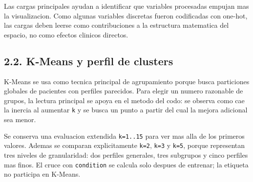 \documentclass[11pt]{article}
\begin{document}
Las cargas principales ayudan a identificar que variables procesadas
empujan mas la visualizacion. Como algunas variables discretas fueron
codificadas con one-hot, las cargas deben leerse como contribuciones a
la estructura matematica del espacio, no como efectos clinicos directos.

    \subsection{2.2. K-Means y perfil de
clusters}\label{k-means-y-perfil-de-clusters}

K-Means se usa como tecnica principal de agrupamiento porque busca
particiones globales de pacientes con perfiles parecidos. Para elegir un
numero razonable de grupos, la lectura principal se apoya en el metodo
del codo: se observa como cae la inercia al aumentar \texttt{k} y se
busca un punto a partir del cual la mejora adicional sea menor.

Se conserva una evaluacion extendida \texttt{k=1..15} para ver mas alla
de los primeros valores. Ademas se comparan explicitamente \texttt{k=2},
\texttt{k=3} y \texttt{k=5}, porque representan tres niveles de
granularidad: dos perfiles generales, tres subgrupos y cinco perfiles
mas finos. El cruce con \texttt{condition} se calcula solo despues de
entrenar; la etiqueta no participa en K-Means.
\end{document}
